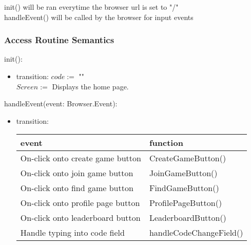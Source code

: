 \documentclass[12pt, titlepage]{article}
\begin{document}
init() will be ran everytime the browser url is set to "/"\\
handleEvent() will be called by the browser for input events

\subsubsection{Access Routine Semantics}
\noindent init():
\begin{itemize}
\item transition:
$code :=$ ""\\
$Screen :=$ Displays the home page. 
\end{itemize}


\noindent handleEvent(event: Browser.Event):
\begin{itemize}
\item transition: \begin{tabular}{p{5cm} p{4cm}}
\hline
\textbf{event} & \textbf{function} \\
\hline
On-click onto create game button & CreateGameButton() \\
On-click onto join game button & JoinGameButton() \\
On-click onto find game button & FindGameButton() \\
On-click onto profile page button & ProfilePageButton() \\
On-click onto leaderboard button & LeaderboardButton() \\
Handle typing into code field  & handleCodeChangeField() \\
\hline
\end{tabular}
\end{itemize}
\end{document}
